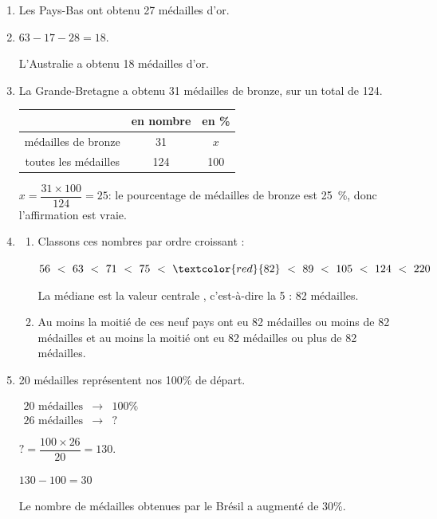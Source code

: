 \begin{enumerate}
	\item Les Pays-Bas ont obtenu 27 médailles d'or.
	\item $63-17-28=18$.

L'Australie a obtenu 18 médailles d'or.
	\item La Grande-Bretagne a obtenu 31 médailles de bronze, sur un total de 124.

		\begin{tabular}{c|c|c}
		&en nombre  &en \% \\\hline
médailles de bronze		& 31 &$x$  \\\hline
toutes les médailles&124&100\\
	\end{tabular}


	$x=\dfrac{31\times100}{124}=25$: le pourcentage de médailles de bronze est 25~\%, donc l'affirmation est vraie.
	\item 	\begin{enumerate}
				\item Classons ces nombres par ordre croissant :

				$56 ~<~ 63 ~<~ 71 ~<~ 75 ~<~ \textcolor{red}{82} ~<~ 89 ~<~ 105 ~<~ 124 ~<~ 220$

				La médiane est la valeur \og centrale \fg{}, c'est-à-dire la 5 : 82 médailles.
				\item Au moins la moitié de ces neuf pays ont eu 82 médailles ou moins de 82 médailles et au moins la moitié ont eu 82 médailles ou plus de 82 médailles.
			\end{enumerate}
	\item 20 médailles représentent nos 100\% de départ.

	\(\begin{array}{ccc}
	20 \text{ médailles}& \to & 100\%\\
	26 \text{ médailles}& \to & ?
	\end{array}\)

	$?=\dfrac{100\times 26 }{20}=130$.

	$130-100=30$

	Le nombre de médailles obtenues par le Brésil a augmenté de 30\%.
\end{enumerate}

